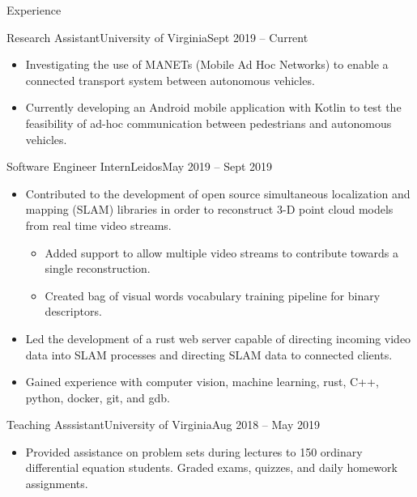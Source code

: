 \documentclass[]{mcdowellcv}
\begin{document}
\begin{cvsection}{Experience}
    \begin{cvsubsection}{Research Assistant}{University of Virginia}{Sept 2019 -- Current}
		\begin{itemize}%
			\item Investigating the use of MANETs (Mobile Ad Hoc Networks) to enable a connected transport system between autonomous vehicles.
			\item Currently developing an Android mobile application with Kotlin to test the feasibility of ad-hoc communication between pedestrians and autonomous vehicles.
		\end{itemize}
	\end{cvsubsection}

	\begin{cvsubsection}{Software Engineer Intern}{Leidos}{May 2019 -- Sept 2019}
		\begin{itemize}%
			\item Contributed to the development of open source simultaneous localization and mapping (SLAM) libraries in order to reconstruct 3-D point cloud models from real time video streams.
			\begin{itemize}
				\item Added support to allow multiple video streams to contribute towards a single reconstruction.
				\item Created bag of visual words vocabulary training pipeline for binary descriptors.
			\end{itemize}
			
			\item Led the development of a rust web server capable of directing incoming video data into SLAM processes and directing SLAM data to connected clients.
			\item Gained experience with computer vision, machine learning, rust, C++, python, docker, git, and gdb.
		\end{itemize}
	\end{cvsubsection}
	\begin{cvsubsection}{Teaching Asssistant}{University of Virginia}{Aug 2018 -- May 2019}
		            
		\begin{itemize}%
			\item Provided assistance on problem sets during lectures to 150 ordinary differential equation students.  Graded exams, quizzes, and daily homework assignments.
		\end{itemize}
	\end{cvsubsection}
\end{cvsection}
\end{document}
